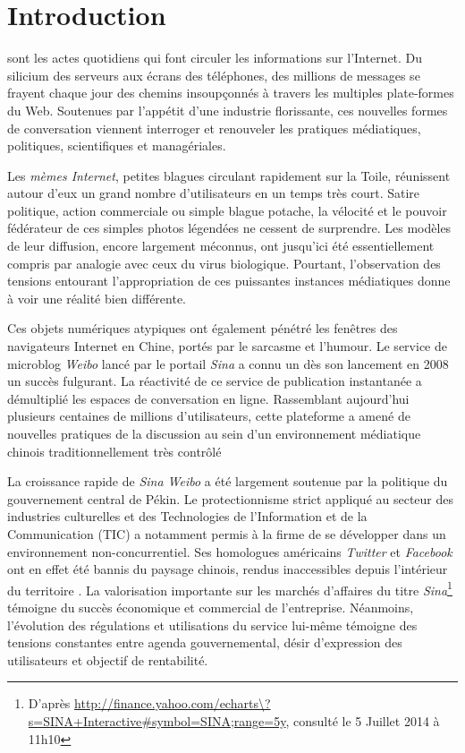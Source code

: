 \chapter*{Introduction}


 sont les actes quotidiens qui font circuler les informations sur l'Internet. Du silicium des serveurs aux écrans des téléphones, des millions de messages se frayent chaque jour des chemins insoupçonnés à travers les multiples plate-formes du Web. Soutenues par l'appétit d'une industrie florissante, ces nouvelles formes de conversation viennent interroger et renouveler les pratiques médiatiques, politiques, scientifiques et managériales.

Les \textit{mèmes Internet}, petites blagues circulant rapidement sur la Toile, réunissent autour d'eux un grand nombre d'utilisateurs en un temps très court. Satire politique, action commerciale ou simple blague potache, la vélocité et le pouvoir fédérateur de ces simples photos légendées ne cessent de surprendre. Les modèles de leur diffusion, encore largement méconnus, ont jusqu'ici été essentiellement compris par analogie avec ceux du virus biologique. Pourtant, l'observation des tensions entourant l'appropriation de ces puissantes instances médiatiques donne à voir une réalité bien différente.

Ces objets numériques atypiques ont également pénétré les fenêtres des navigateurs Internet en Chine, portés par le sarcasme et l'humour. Le service de microblog \textit{Weibo} lancé par le portail \textit{Sina} a connu un dès son lancement en 2008 un succès fulgurant. La réactivité de ce service de publication instantanée a démultiplié les espaces de conversation en ligne. Rassemblant aujourd'hui plusieurs centaines de millions d'utilisateurs, cette plateforme a amené de nouvelles pratiques de la discussion au sein d'un environnement médiatique chinois traditionnellement très contrôlé \citep{MacKinnon2009, Douzet2007, Yang2008}

La croissance rapide de \textit{Sina Weibo} a été largement soutenue par la politique du gouvernement central de Pékin. Le protectionnisme strict appliqué au secteur des industries culturelles et des Technologies de l'Information et de la Communication (TIC) a notamment permis à la firme de se développer dans un environnement non-concurrentiel. Ses homologues américains \textit{Twitter} et \textit{Facebook} ont en effet été bannis du paysage chinois, rendus inaccessibles depuis l'intérieur du territoire \citep{Sullivan2012}. La valorisation importante sur les marchés d'affaires du titre \textit{Sina}\footnote{D'après \url{http://finance.yahoo.com/echarts\?s=SINA+Interactive\#symbol=SINA;range=5y}, consulté le 5 Juillet 2014 à 11h10} témoigne du succès économique et commercial de l'entreprise. Néanmoins, l'évolution des régulations et utilisations du service lui-même témoigne des tensions constantes entre agenda gouvernemental, désir d'expression des utilisateurs et objectif de rentabilité.

